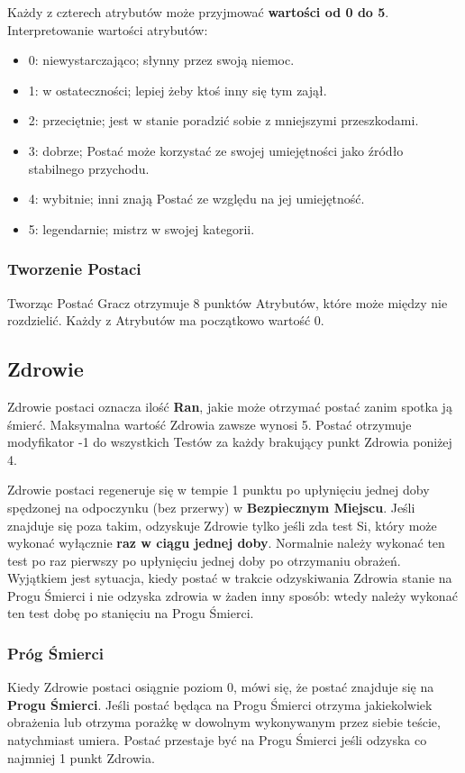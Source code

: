 \documentclass[10pt,a4paper]{book}
\begin{document}
\begin{multicols}{2}
Każdy z czterech atrybutów może przyjmować \textbf{wartości od 0 do 5}. Interpretowanie wartości atrybutów:
\begin{itemize}
	\item 0: niewystarczająco; słynny przez swoją niemoc.
	\item 1: w ostateczności; lepiej żeby ktoś inny się tym zajął.
	\item 2: przeciętnie; jest w stanie poradzić sobie z mniejszymi przeszkodami.
	\item 3: dobrze; Postać może korzystać ze swojej umiejętności jako źródło stabilnego przychodu.
	\item 4: wybitnie; inni znają Postać ze względu na jej umiejętność.
	\item 5: legendarnie; mistrz w swojej kategorii.
\end{itemize}

\subsubsection*{Tworzenie Postaci}
Tworząc Postać Gracz otrzymuje 8 punktów Atrybutów, które może między nie rozdzielić. Każdy z Atrybutów ma początkowo wartość 0.


\subsection*{Zdrowie}
Zdrowie postaci oznacza ilość \textbf{Ran}, jakie może otrzymać postać zanim spotka ją śmierć. Maksymalna wartość Zdrowia zawsze wynosi 5. Postać otrzymuje modyfikator -1 do wszystkich Testów za każdy brakujący punkt Zdrowia poniżej 4.

Zdrowie postaci regeneruje się w tempie 1 punktu po upłynięciu jednej doby spędzonej na odpoczynku (bez przerwy) w \textbf{Bezpiecznym Miejscu}. Jeśli znajduje się poza takim, odzyskuje Zdrowie tylko jeśli zda test Si, który może wykonać wyłącznie \textbf{raz w ciągu jednej doby}. Normalnie należy wykonać ten test po raz pierwszy po upłynięciu jednej doby po otrzymaniu obrażeń. Wyjątkiem jest sytuacja, kiedy postać w trakcie odzyskiwania Zdrowia stanie na Progu Śmierci i nie odzyska zdrowia w żaden inny sposób: wtedy należy wykonać ten test dobę po stanięciu na Progu Śmierci.

\subsubsection{Próg Śmierci}
Kiedy Zdrowie postaci osiągnie poziom 0, mówi się, że postać znajduje się na \textbf{Progu Śmierci}. Jeśli postać będąca na Progu Śmierci otrzyma jakiekolwiek obrażenia lub otrzyma porażkę w dowolnym wykonywanym przez siebie teście, natychmiast umiera. Postać przestaje być na Progu Śmierci jeśli odzyska co najmniej 1 punkt Zdrowia.



\end{multicols}
\end{document}
